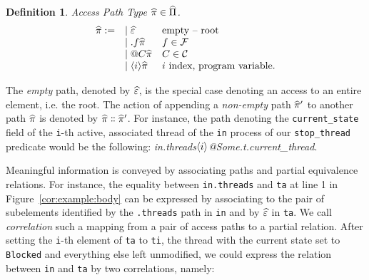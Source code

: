 \documentclass[11pt]{article}
\newtheorem{definition}{Definition}
\newcommand{\disp}[1]{\lstinline&#1&}
\def\fset{\ensuremath{\mathcal{F}}}
\def\cset{\ensuremath{\mathcal{C}}}
\newcommand{\ver}{\arrowvert \;}
\begin{document}
\begin{definition}{Access Path Type $\widehat{\pi} \in \widehat{\Pi}$.}\label{ch7:apathtype:definition}
\[
\begin{array}{lll}
 \cpath := &\ver \pempty     & \textrm{empty -- root}  \\ 
           &\ver \pstruct\cpath & f \in \fset \\
           &\ver \pvar\cpath    & C \in \cset \\
           &\ver \pcell\cpath   & \textrm{$i$ index, program variable.} 
\end{array}
\]   
\end{definition}

\noindent The \emph{empty} path, denoted by $\widehat{\varepsilon}$, is the special case denoting an
access to an entire element, i.e. the root. The action of appending a 
\emph{non-empty} path $\widehat{\pi}'$ to another path $\widehat{\pi}$ is denoted by 
$\cpath \append\cpath'$. For instance, the path denoting the 
\disp{current_state} field of the \disp{i}-th active, associated thread of the 
\disp{in} process of our \disp{stop_thread} predicate would be the following: 
\emph{in.threads$\langle i \rangle$@Some.t.current\_thread}.
  
Meaningful information is conveyed by associating paths and partial equivalence
relations. For instance, the equality between \disp{in.threads} and \disp{ta} at 
line 1 in Figure~\ref{cor:example:body} can be expressed by associating {\equal} to the
pair of subelements identified by the {\disp{.threads}} path in \disp{in} and by 
$\widehat{\varepsilon}$ in \disp{ta}. We call \emph{correlation} such a mapping from a pair of 
access paths to a partial relation. After setting the \disp{i}-th element of 
\disp{ta} to \disp{ti}, the thread with the current state set to \disp{Blocked} 
and everything else left unmodified, we could express the relation between 
\disp{in} and \disp{ta} by two correlations, namely:
\end{document}

